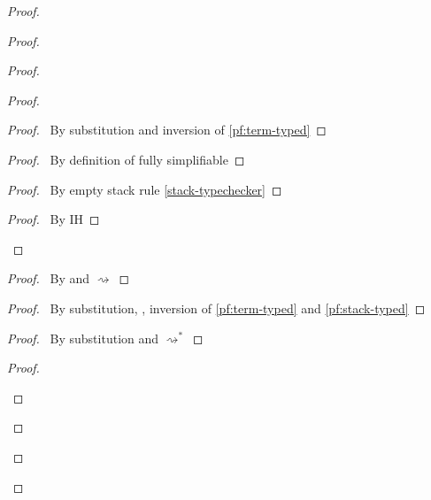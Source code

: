 \documentclass[a4paper]{article}
\begin{document}
\begin{proof}
\begin{proof}
\begin{proof}
      \begin{proof}
        \begin{proof}
          \pf\ By substitution and inversion of \ref{pf:term-typed}
        \end{proof}
        \begin{proof}
          \pf\ By definition of fully simplifiable
        \end{proof}
        \begin{proof}
          \pf\ By empty stack rule \ref{stack-typechecker}
        \end{proof}
        \qedstep
        \begin{proof}
          \pf\ By IH
        \end{proof}
      \end{proof}
      \begin{proof}
        \pf\ By  and $\rightsquigarrow$
      \end{proof}
      \begin{proof}
        \pf\ By substitution, , inversion of \ref{pf:term-typed} and \ref{pf:stack-typed}
      \end{proof}
      \begin{proof}
        \pf\ By substitution and $\rightsquigarrow^*$
      \end{proof}
      \qedstep
      \begin{proof}
        \pf\ \begin{enumerate}

\end{enumerate}
\end{proof}
\end{proof}
\end{proof}
\end{proof}
\end{document}
